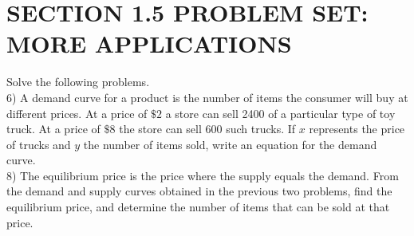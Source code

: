 \section*{SECTION 1.5 PROBLEM SET: MORE APPLICATIONS}
Solve the following problems.\\
6) A demand curve for a product is the number of items the consumer will buy at different prices. At a price of $\$ 2$ a store can sell 2400 of a particular type of toy truck. At a price of $\$ 8$ the store can sell 600 such trucks. If $x$ represents the price of trucks and $y$ the number of items sold, write an equation for the demand curve.\\
8) The equilibrium price is the price where the supply equals the demand. From the demand and supply curves obtained in the previous two problems, find the equilibrium price, and determine the number of items that can be sold at that price.

